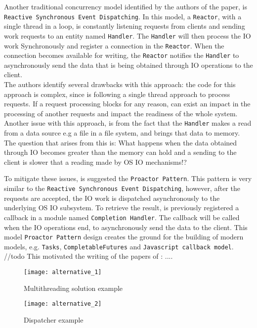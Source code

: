 Another traditional concurrency model identified by the authors of the paper, is \texttt{Reactive Synchronous Event Dispatching}. 
In this model, a \texttt{Reactor}, with a single thread in a loop, is constantly listening requests from clients and sending work requests to an entity named \texttt{Handler}. 
The \texttt{Handler} will then process the IO work Synchronously and register a connection in the \texttt{Reactor}. When the connection becomes available for writing, the \texttt{Reactor} notifies the \texttt{Handler} to asynchronously send the data that is being obtained through IO operations to the client.\\
The authors identify several drawbacks with this approach: the code for this approach is complex, since is following a single thread approach to process requests. If a request processing blocks for any reason, can exist an impact in the processing of another requests and impact the readiness of the whole system. 
Another issue with this approach, is from the fact that the \texttt{Handler} makes a read from a data source e.g a file in a file system, and brings that data to memory. The question that arises from this is: What happens when the data obtained through IO becomes greater than the memory can hold and a sending to the client is slower that a reading made by OS IO mechanisms!?

To mitigate these issues, is suggested the \texttt{Proactor Pattern}. This pattern is very similar to the \texttt{Reactive Synchronous Event Dispatching}, however, after the requests are accepted, the IO work is dispatched asynchronously to the underlying OS IO subsystem. 
To retrieve the result, is previously registered a callback in a module named \texttt{Completion Handler}. The callback will be called when the IO operations end, to asynchronously send the data to the client. 
This model \texttt{Proactor Pattern} design creates the ground for the building of modern models, e.g. \texttt{Tasks}, \texttt{CompletableFutures} and \texttt{Javascript callback model}. //todo This motivated the writing of the  papers of : .... 


\begin{figure}[ht]
	\centering
	\texttt{[image: alternative\_1]}
	  \caption{Multithreading solution example}
  \label{fig:bibtex}
\end{figure}


\begin{figure}[ht]
	\centering
	\texttt{[image: alternative\_2]}
	  \caption{Dispatcher example}
  \label{fig:bibtex}
\end{figure}

